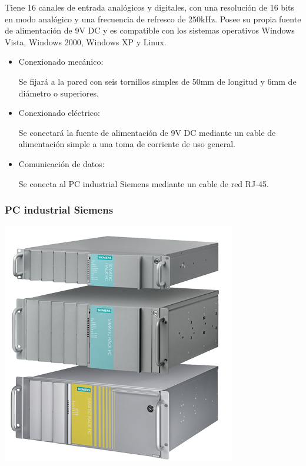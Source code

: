 		Tiene 16 canales de entrada analógicos y digitales, con una resolución de 16 bits en modo analógico y una frecuencia de refresco de 250kHz. Posee su propia fuente de alimentación de 9V DC y es compatible con los sistemas operativos Windows Vista, Windows 2000, Windows XP y Linux.\\

		\begin{itemize}
				\item{Conexionado mecánico:}
				
				Se fijará a la pared con seis tornillos simples de 50mm de longitud y 6mm de diámetro o superiores.

				\item{Conexionado eléctrico:}

				Se conectará la fuente de alimentación de 9V DC mediante un cable de alimentación simple a una toma de corriente de uso general.
				 				
				\item{Comunicación de datos:}
				
				Se conecta al PC industrial Siemens mediante un cable de red RJ-45.

		\end{itemize}

\newpage

	\subsubsection{PC industrial Siemens}

	\includegraphics[scale=0.4]{Datasheets/12Foto.png}\\

